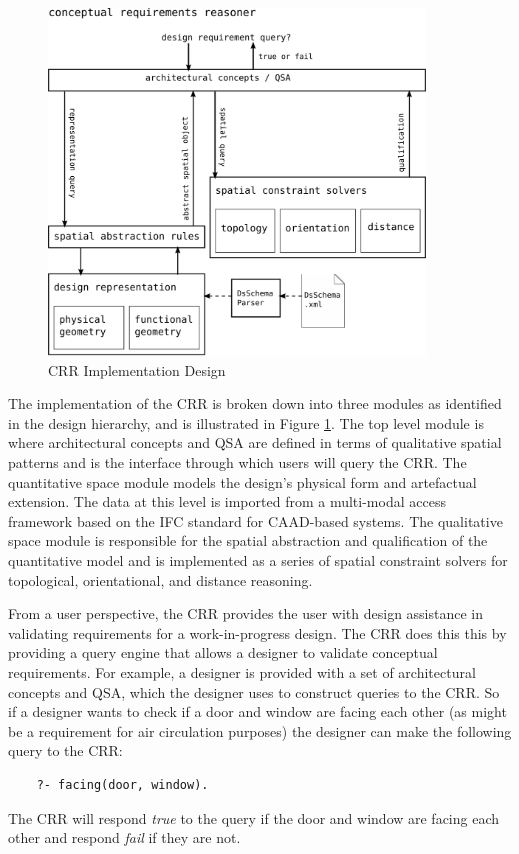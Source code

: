 \documentclass[12pt]{ucthesis}
\begin{document}
\begin{figure}[t]
\centering
\includegraphics[width=100mm]{design}
\caption{CRR Implementation Design}
\label{crr design implementation}
\end{figure}

The implementation of the CRR is broken down into three modules as identified in the design hierarchy, and is illustrated in Figure \ref{crr design implementation}. The top level module is where architectural concepts and QSA are defined in terms of qualitative spatial patterns and is the interface through which  users will query the CRR. The quantitative space module models the design's physical form and artefactual extension. The data at this level is imported from a multi-modal access framework \cite{carl} based on the IFC standard for CAAD-based systems. The qualitative space module is responsible for the spatial abstraction and qualification of the quantitative model and is implemented as a series of spatial constraint solvers for topological, orientational, and distance reasoning. 

From a user perspective, the CRR provides the user with design assistance in validating requirements for a work-in-progress design. The CRR does this this by providing a query engine that allows a designer to validate conceptual requirements. For example, a designer is provided with a set of architectural concepts and QSA, which the designer uses to construct queries to the CRR. So if a designer wants to check if a door and window are facing each other (as might be a requirement for air circulation purposes) the designer can make the following query to the CRR:
\begin{verbatim}
    ?- facing(door, window).
\end{verbatim} The CRR will respond \emph{true} to the query if the door and window are facing each other and respond \emph{fail} if they are not.
\end{document}
